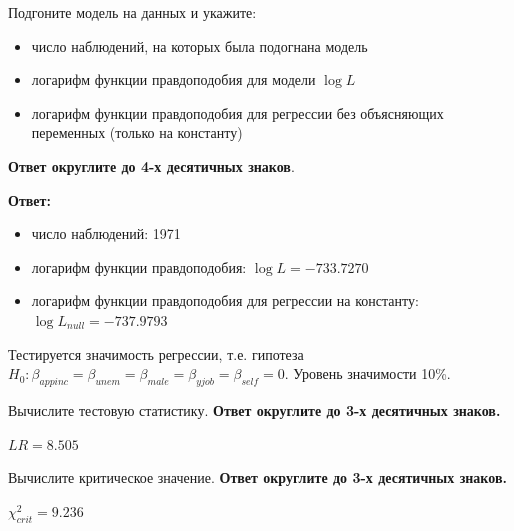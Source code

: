 \documentclass[
  russian,
]{article}
\providecommand{\tightlist}{%
  \setlength{\itemsep}{0pt}\setlength{\parskip}{0pt}}
\begin{document}
Подгоните модель на данных и укажите:

\begin{itemize}
\tightlist
\item
  число наблюдений, на которых была подогнана модель
\item
  логарифм функции правдоподобия для модели \(\log L\)
\item
  логарифм функции правдоподобия для регрессии без объясняющих
  переменных (только на константу)
\end{itemize}

\textbf{Ответ округлите до 4-х десятичных знаков}.

\textbf{Ответ:}

\begin{itemize}
\tightlist
\item
  число наблюдений: 1971
\item
  логарифм функции правдоподобия: \(\log L = -733.7270\)
\item
  логарифм функции правдоподобия для регрессии на константу:
  \(\log L_{null} = -737.9793\)
\end{itemize}

Тестируется значимость регрессии, т.е. гипотеза
\(H_0:\beta_{appinc}=\beta_{unem}=\beta_{male}=\beta_{yjob}=\beta_{self}=0\).
{Уровень значимости 10\%.}

Вычислите тестовую статистику. \textbf{Ответ округлите до 3-х десятичных
знаков.}

\begin{tcolorbox}[enhanced jigsaw, arc=.35mm, bottomrule=.15mm, bottomtitle=1mm, breakable, colback=white, colbacktitle=quarto-callout-note-color!10!white, colframe=quarto-callout-note-color-frame, coltitle=black, left=2mm, leftrule=.75mm, opacityback=0, opacitybacktitle=0.6, rightrule=.15mm, title=\textcolor{quarto-callout-note-color}{\faInfo}\hspace{0.5em}{LR Статистика}, titlerule=0mm, toprule=.15mm, toptitle=1mm]

\(LR = 8.505\)

\end{tcolorbox}

Вычислите критическое значение. \textbf{Ответ округлите до 3-х
десятичных знаков.}

\begin{tcolorbox}[enhanced jigsaw, arc=.35mm, bottomrule=.15mm, bottomtitle=1mm, breakable, colback=white, colbacktitle=quarto-callout-note-color!10!white, colframe=quarto-callout-note-color-frame, coltitle=black, left=2mm, leftrule=.75mm, opacityback=0, opacitybacktitle=0.6, rightrule=.15mm, title=\textcolor{quarto-callout-note-color}{\faInfo}\hspace{0.5em}{Критическое значение}, titlerule=0mm, toprule=.15mm, toptitle=1mm]

\(\chi^2_{crit} = 9.236\)

\end{tcolorbox}
\end{document}
